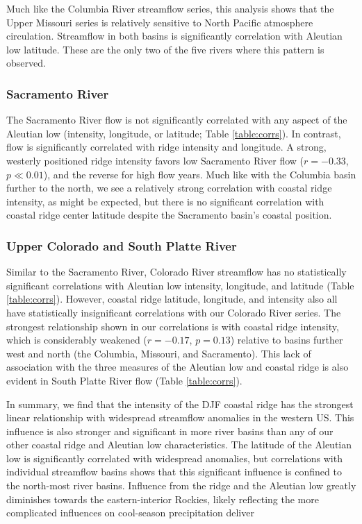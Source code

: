 \documentclass[final, double]{ua-thesis}
\begin{document}
Much like the Columbia River streamflow series, this analysis shows that the Upper Missouri series is relatively sensitive to North Pacific atmosphere circulation. Streamflow in both basins is significantly correlation with Aleutian low latitude. These are the only two of the five rivers where this pattern is observed. 

\subsubsection{Sacramento River}

The Sacramento River flow is not significantly correlated with any aspect of the Aleutian low (intensity, longitude, or latitude; Table \ref{table:corrs}). In contrast, flow is significantly correlated with ridge intensity and longitude.  A strong, westerly positioned ridge intensity favors low Sacramento River flow ($r = -0.33$, $p \ll 0.01$), and the reverse for high flow years. Much like with the Columbia basin further to the north, we see a relatively strong correlation with coastal ridge intensity, as might be  expected, but there is no significant correlation with coastal ridge center latitude despite the Sacramento basin's coastal position.

\subsubsection{Upper Colorado and South Platte River}

Similar to the Sacramento River, Colorado River streamflow has no statistically significant correlations with Aleutian low intensity, longitude, and latitude (Table \ref{table:corrs}). However, coastal ridge latitude, longitude, and intensity also all have statistically insignificant correlations with our Colorado River series. The strongest relationship shown in our correlations is with coastal ridge intensity, which is considerably weakened ($r = -0.17$, $p = 0.13$) relative to basins further west and north (the Columbia, Missouri, and Sacramento). This lack of association with the three measures of the Aleutian low and coastal ridge is also evident in South Platte River flow (Table \ref{table:corrs}).

In summary, we find that the intensity of the DJF coastal ridge has the strongest linear relationship with widespread streamflow anomalies in the western US. This influence is also stronger and significant in more river basins than any of our other coastal ridge and Aleutian low characteristics. The latitude of the Aleutian low is significantly correlated with widespread anomalies, but correlations with individual streamflow basins shows that this significant influence is confined to the north-most river basins. Influence from the ridge and the Aleutian low greatly diminishes towards the eastern-interior Rockies, likely reflecting the more complicated influences on cool-season precipitation deliver \citep[e.g., ][]{2changnon_hydroclimatic_1991}
\end{document}
